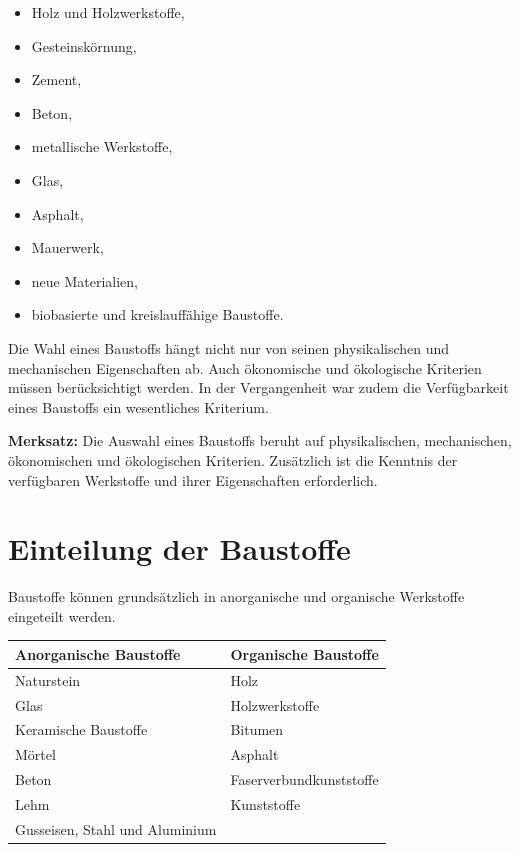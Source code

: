 \documentclass[
  12pt,
  a4paper,
  oneside
]{scrreprt}
\begin{document}
\begin{itemize}
  \item Holz und Holzwerkstoffe,
  \item Gesteinskörnung,
  \item Zement,
  \item Beton,
  \item metallische Werkstoffe,
  \item Glas,
  \item Asphalt,
  \item Mauerwerk,
  \item neue Materialien,
  \item biobasierte und kreislauffähige Baustoffe.
\end{itemize}



Die Wahl eines Baustoffs hängt nicht nur von seinen physikalischen und
mechanischen Eigenschaften ab. Auch ökonomische und ökologische
Kriterien müssen berücksichtigt werden. In der Vergangenheit war zudem
die Verfügbarkeit eines Baustoffs ein wesentliches Kriterium.


\begin{merksatzbox}
\textbf{Merksatz:}
Die Auswahl eines Baustoffs beruht auf physikalischen, mechanischen,
ökonomischen und ökologischen Kriterien. Zusätzlich ist die Kenntnis
der verfügbaren Werkstoffe und ihrer Eigenschaften erforderlich.

\end{merksatzbox}

\section{Einteilung der Baustoffe}

Baustoffe können grundsätzlich in anorganische und organische
Werkstoffe eingeteilt werden. 

\begin{longtable}{
  >{\raggedright\arraybackslash}p{}
  >{\raggedright\arraybackslash}p{}
}
\toprule
\textbf{Anorganische Baustoffe} &
\textbf{Organische Baustoffe} \\
\midrule
\endhead

Naturstein &
Holz \\

Glas &
Holzwerkstoffe \\

Keramische Baustoffe &
Bitumen \\

Mörtel &
Asphalt \\

Beton &
Faserverbundkunststoffe \\

Lehm &
Kunststoffe \\

Gusseisen, Stahl und Aluminium &
\\

\bottomrule
\end{longtable}
\end{document}
